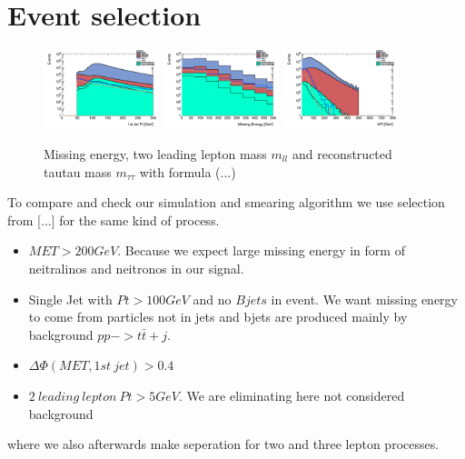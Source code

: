 \documentclass[tightenline,notitlepage,nofootinbib]{revtex4-1}
\begin{document}

\section{Event selection}


\begin{figure}[!ht]
  \centering
  \includegraphics[width=0.3\textwidth]{h_PtJets1st.png}
  \includegraphics[width=0.3\textwidth]{h_MET.png}
  \includegraphics[width=0.3\textwidth]{h_MT.png}
  \caption{Missing energy, two leading lepton mass $m_{ll}$ and reconstructed tautau mass $m_{\tau\tau}$ with formula (...)}
\end{figure}

To compare and check our simulation and smearing algorithm we use selection from [...] for the same kind of process.  
\begin{itemize}
\item $MET>200 GeV$. Because we expect large missing energy in form of neitralinos and neitronos in our signal.
\item Single Jet with $Pt>100GeV$ and no $Bjets$ in event. We want missing energy to come from particles not in jets and bjets are produced mainly by background $pp->t \bar t + j$.
\item $\Delta \Phi(MET,1st ~jet)>0.4$
\item $2~ leading ~ lepton ~ Pt > 5 GeV$. We are eliminating here not considered background
\end{itemize}
where we also afterwards make seperation for two and three lepton processes. 
\end{document}
